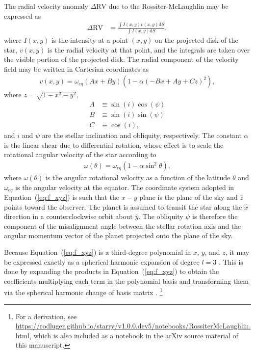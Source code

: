 \documentclass[twocolumn]{aastex63}
\begin{document}
The radial velocity anomaly $\Delta\mathrm{RV}$ due to the Rossiter-McLaughlin may be expressed as \citep[e.g.][]{Gimenez06}
%
\begin{align}
    \label{eq:DeltaRV}
    \Delta\mathrm{RV} &= \frac{\int I(x, y) v(x, y) \mathrm{d}S}{\int I(x, y)\mathrm{d}S},
\end{align}
%
where $I(x,y)$ is the intensity at a point $(x, y)$ on the projected disk of the star, $v(x, y)$ is the radial velocity at that point, and the integrals are taken over the visible portion of the projected disk.
The radial component of the velocity field may be written in Cartesian coordinates as \citep[e.g.][]{Short18}
%
\begin{align}
\label{eq:f_xyz}
v(x, y) = \omega_{eq}(Ax + By)\left(1 - \alpha(-Bx + Ay + Cz)^2\right),
\end{align}
%
where $z=\sqrt{1 - x^2 - y^2}$, 
%
\begin{align}
    A &\equiv \sin(i)\cos(\psi) \nonumber \\
    B &\equiv \sin(i)\sin(\psi) \nonumber \\
    C &\equiv \cos(i),
\end{align}
%
and $i$ and $\psi$ are the stellar inclination and obliquity, respectively. 
The constant $\alpha$ is the linear shear due to differential rotation, whose
effect is to scale the rotational angular velocity of the star according to
%
\begin{align}
\omega(\theta) = \omega_{eq}(1 - \alpha \sin^2\theta),
\end{align}
%
where $\omega(\theta)$ is the angular rotational velocity as a function of the latitude $\theta$ and $\omega_{eq}$ is the angular velocity at the equator. 
The coordinate system adopted in Equation~(\ref{eq:f_xyz}) is such that the $x-y$ plane is the plane of the sky and $\hat{z}$ points toward the observer. The planet is assumed to transit the star along the $\hat{x}$ direction in a counterclockwise orbit about $\hat{y}$. The obliquity $\psi$ is therefore the component of the misalignment angle between the stellar rotation axis and the angular momentum vector of the planet projected onto the plane of the sky.

Because Equation~(\ref{eq:f_xyz}) is a third-degree polynomial in $x$, $y$, and $z$, it may be expressed exactly as a spherical harmonic expansion of degree $l=3$ \citep{Luger19}. This is done by expanding the products in Equation~(\ref{eq:f_xyz}) to obtain the coefficients multiplying each term in the polynomial basis \citep[Equation~7 in][]{Luger19} and transforming them via the spherical harmonic change of basis matrix \citep[Equation~9 in][]{Luger19}.%
\footnote{For a derivation, see \url{https://rodluger.github.io/starry/v1.0.0.dev5/notebooks/RossiterMcLaughlin.html}, which is also included as a notebook in the arXiv source material of this manuscript.}%
\end{document}
